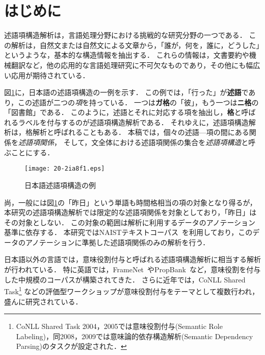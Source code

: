 \documentclass[japanese]{jnlp_1.4}
\begin{document}
\maketitle


\section{はじめに}\label{intro}

述語項構造解析は，言語処理分野における挑戦的な研究分野の一つである．
この解析は，自然文または自然文による文章から，「誰が，何を，誰に，どうした」というような，基本的な構造情報を抽出する．
これらの情報は，文書要約や機械翻訳など，他の応用的な言語処理研究に不可欠なものであり，その他にも幅広い応用が期待されている．

図\ref{example1}に，日本語の述語項構造の一例を示す．
この例では，「行った」が\textbf{述語}であり，この述語が二つの\emph{項}を持っている．
一つは\textbf{ガ格}の「彼」，もう一つは\textbf{ニ格}の「図書館」である．
このように，述語とそれに対応する項を抽出し，\textbf{格}と呼ばれるラベルを付与するのが述語項構造解析である．
それゆえに，述語項構造解析は，格解析と呼ばれることもある．
本稿では，個々の述語—項の間にある関係を\emph{述語項関係}，
そして，文全体における述語項関係の集合を\emph{述語項構造}と呼ぶことにする．

\begin{figure}[b]
\begin{center}
\texttt{[image: 20-2ia8f1.eps]}
\end{center}
\caption{日本語述語項構造の例}
\label{example1}
\end{figure}

尚，一般には図\ref{example1}の「昨日」という単語も時間格相当の項の対象となり得るが，
本研究の述語項構造解析では限定的な述語項関係を対象としており，「昨日」はその対象としない．
この対象の範囲は解析に利用するデータのアノテーション基準に依存する．
本研究ではNAISTテキストコーパス~\cite{iida:2007:law}を利用しており，このデータのアノテーションに準拠した述語項関係のみの解析を行う．

日本語以外の言語では，意味役割付与と呼ばれる述語項構造解析に相当する解析が行われている．
特に英語では，FrameNet~\cite{fillmore:2001:paclic}やPropBank~\cite{palmer:2005:cl}など，意味役割を付与した中規模のコーパスが構築されてきた．
さらに近年では，CoNLL Shared Task\footnote{CoNLL Shared Task 2004，2005では意味役割付与(Semantic Role Labeling)，同2008，2009では意味論的依存構造解析(Semantic Dependency Parsing)のタスクが設定された．}
などの評価型ワークショップが意味役割付与をテーマとして複数行われ，盛んに研究されている．
\end{document}
